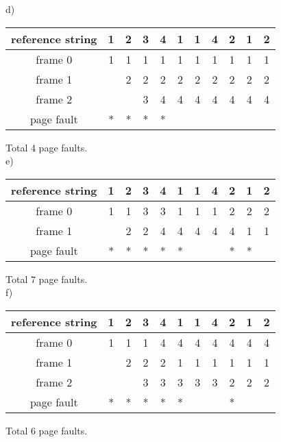 \documentclass[a4paper]{article}
\begin{document}
d)
\begin{center}
	\begin{tabular}{c|c|c|c|c|c|c|c|c|c|c|}
	\hline
	reference string&1&2&3&4&1&1&4&2&1&2 \\
	\hline
	frame 0&1&1&1&1&1&1&1&1&1&1 \\
	\hline
	frame 1&&2&2&2&2&2&2&2&2&2 \\
	\hline
	frame 2&&&3&4&4&4&4&4&4&4 \\
	\hline
	page fault&*&*&*&*&&&&&& \\
	\hline
	\end{tabular}
\end{center}
Total 4 page faults.
\\
e)
\begin{center}
	\begin{tabular}{c|c|c|c|c|c|c|c|c|c|c|}
	\hline
	reference string&1&2&3&4&1&1&4&2&1&2 \\
	\hline
	frame 0&1&1&3&3&1&1&1&2&2&2 \\
	\hline
	frame 1&&2&2&4&4&4&4&4&1&1 \\
	\hline
	page fault&*&*&*&*&*&&&*&*& \\

	\hline
	\end{tabular}
\end{center}
Total 7 page faults.
\\
f)
\begin{center}
	\begin{tabular}{c|c|c|c|c|c|c|c|c|c|c|}
	\hline
	reference string&1&2&3&4&1&1&4&2&1&2 \\
	\hline
	frame 0&1&1&1&4&4&4&4&4&4&4 \\
	\hline
	frame 1&&2&2&2&1&1&1&1&1&1 \\
	\hline
	frame 2&&&3&3&3&3&3&2&2&2 \\
	\hline
	page fault&*&*&*&*&*&&&*&& \\
	\hline
	\end{tabular}
\end{center}
Total 6 page faults.
\\
\end{document}
